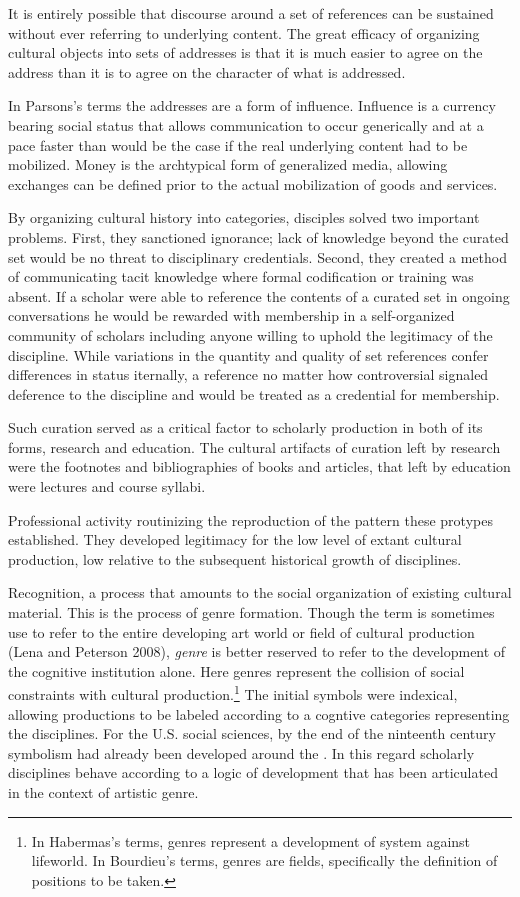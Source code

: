 It is entirely possible that discourse around a set of references can be
sustained without ever referring to underlying content. The great
efficacy of organizing cultural objects into sets of addresses is that
it is much easier to agree on the address than it is to agree on the
character of what is addressed.

In Parsons's terms the addresses are a form of influence. Influence is a
currency bearing social status that allows communication to occur
generically and at a pace faster than would be the case if the real
underlying content had to be mobilized. Money is the archtypical form of
generalized media, allowing exchanges can be defined prior to the actual
mobilization of goods and services.

By organizing cultural history into categories, disciples solved two
important problems. First, they sanctioned ignorance; lack of knowledge
beyond the curated set would be no threat to disciplinary credentials.
Second, they created a method of communicating tacit knowledge where
formal codification or training was absent. If a scholar were able to
reference the contents of a curated set in ongoing conversations he
would be rewarded with membership in a self-organized community of
scholars including anyone willing to uphold the legitimacy of the
discipline. While variations in the quantity and quality of set
references confer differences in status iternally, a reference no matter
how controversial signaled deference to the discipline and would be
treated as a credential for membership.

Such curation served as a critical factor to scholarly production in
both of its forms, research and education. The cultural artifacts of
curation left by research were the footnotes and bibliographies of books
and articles, that left by education were lectures and course syllabi.

Professional activity routinizing the reproduction of the pattern these
protypes established. They developed legitimacy for the low level of
extant cultural production, low relative to the subsequent historical
growth of disciplines.

Recognition, a process that amounts to the social organization of
existing cultural material. This is the process of genre formation.
Though the term is sometimes use to refer to the entire developing art
world or field of cultural production (Lena and Peterson 2008),
\emph{genre} is better reserved to refer to the development of the
cognitive institution alone. Here genres represent the collision of
social constraints with cultural production.\footnote{In Habermas's
  terms, genres represent a development of system against lifeworld. In
  Bourdieu's terms, genres are fields, specifically the definition of
  positions to be taken.} The initial symbols were indexical, allowing
productions to be labeled according to a cogntive categories
representing the disciplines. For the U.S. social sciences, by the end
of the ninteenth century symbolism had already been developed around the
. In this regard scholarly disciplines behave according to a logic of
development that has been articulated in the context of artistic genre.

